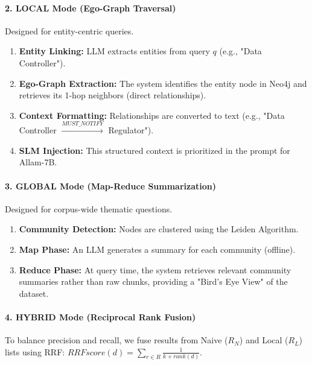 \documentclass[11pt, onecolumn]{article}
\begin{document}
\paragraph{2. LOCAL Mode (Ego-Graph Traversal)}
Designed for entity-centric queries.
\begin{enumerate}
    \item \textbf{Entity Linking:} LLM extracts entities from query $q$ (e.g., "Data Controller").
    \item \textbf{Ego-Graph Extraction:} The system identifies the entity node in Neo4j and retrieves its 1-hop neighbors (direct relationships).
    \item \textbf{Context Formatting:} Relationships are converted to text (e.g., "Data Controller $\xrightarrow{MUST\_NOTIFY}$ Regulator").
    \item \textbf{SLM Injection:} This structured context is prioritized in the prompt for Allam-7B.
\end{enumerate}

\paragraph{3. GLOBAL Mode (Map-Reduce Summarization)}
Designed for corpus-wide thematic questions.
\begin{enumerate}
    \item \textbf{Community Detection:} Nodes are clustered using the Leiden Algorithm.
    \item \textbf{Map Phase:} An LLM generates a summary for each community (offline).
    \item \textbf{Reduce Phase:} At query time, the system retrieves relevant community summaries rather than raw chunks, providing a "Bird's Eye View" of the dataset.
\end{enumerate}

\paragraph{4. HYBRID Mode (Reciprocal Rank Fusion)}
To balance precision and recall, we fuse results from Naive ($R_N$) and Local ($R_L$) lists using RRF:
$RRF score(d) = \sum_{r \in R} \frac{1}{k + rank(d)}$.
\end{document}
